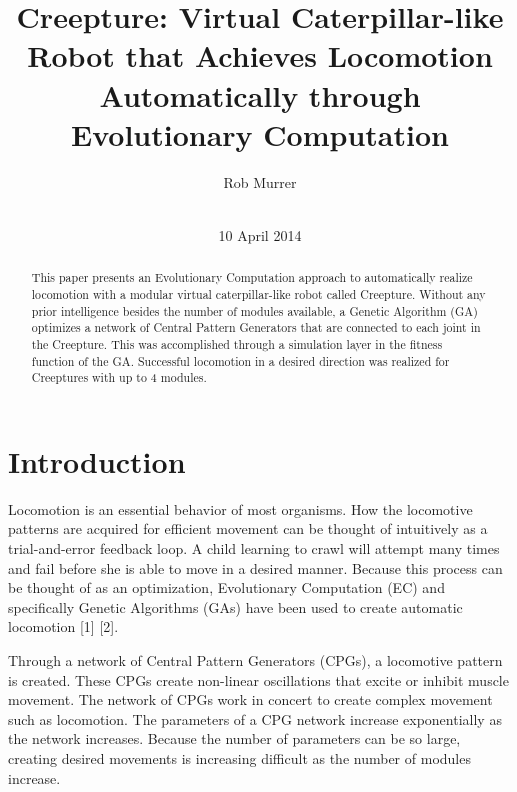 \documentclass{acm_proc_article-sp}
\begin{document}
\title{Creepture: Virtual Caterpillar-like Robot that Achieves Locomotion
Automatically through Evolutionary Computation}

\author{
    \alignauthor
    Rob Murrer \\ 
    \\
   }

\date{10 April 2014}

\maketitle
\begin{abstract}
This paper presents an Evolutionary Computation approach to automatically
realize locomotion with a modular virtual caterpillar-like robot called
Creepture. Without any prior intelligence besides the number of modules
available, a Genetic Algorithm (GA) optimizes a network of Central
Pattern Generators that are connected to each joint in the Creepture.
This was accomplished through a simulation layer in the fitness function
of the GA. Successful locomotion in a desired direction was realized for
Creeptures with up to 4 modules.
\end{abstract}


\section{Introduction}
Locomotion is an essential behavior of most organisms. How the
locomotive patterns are acquired for efficient movement can be thought
of intuitively as a trial-and-error feedback loop. A child learning to
crawl will attempt many times and fail before she is able to move in a
desired manner. Because this process can be thought of as an
optimization, Evolutionary Computation (EC) and specifically Genetic
Algorithms (GAs) have been used to create automatic locomotion {[}1{]}
{[}2{]}.

Through a network of Central Pattern Generators (CPGs), a locomotive
pattern is created. These CPGs create non-linear oscillations that
excite or inhibit muscle movement. The network of CPGs work in concert
to create complex movement such as locomotion. The parameters of a CPG
network increase exponentially as the network increases. Because the
number of parameters can be so large, creating desired movements is
increasing difficult as the number of modules increase.
\end{document}

